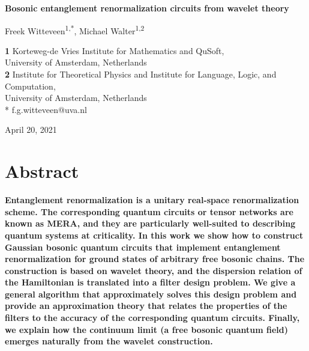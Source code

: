 \documentclass[submission, Phys]{SciPost}
\theoremstyle{definition}
\theoremstyle{remark}
\begin{document}
\begin{center}{\Large \textbf{
Bosonic entanglement renormalization circuits from wavelet theory
}}\end{center}

\begin{center}
Freek Witteveen\textsuperscript{1,*},
Michael Walter\textsuperscript{1,2}
\end{center}


\begin{center}
{\bf 1} Korteweg-de Vries Institute for Mathematics and QuSoft, \\ University of Amsterdam, Netherlands
\\
{\bf 2} Institute for Theoretical Physics and Institute for Language, Logic, and Computation, \\ University of Amsterdam, Netherlands
\\
* f.g.witteveen@uva.nl
\end{center}

\begin{center}
April 20, 2021
\end{center}


\section*{Abstract}
{\bf
Entanglement renormalization is a unitary real-space renormalization scheme.
The corresponding quantum circuits or tensor networks are known as MERA, and they are particularly well-suited to describing quantum systems at criticality.
In this work we show how to construct Gaussian bosonic quantum circuits that implement entanglement renormalization for ground states of arbitrary free bosonic chains.
The construction is based on wavelet theory, and the dispersion relation of the Hamiltonian is translated into a filter design problem.
We give a general algorithm that approximately solves this design problem and provide an approximation theory that relates the properties of the filters to the accuracy of the corresponding quantum circuits. %
Finally, we explain how the continuum limit (a free bosonic quantum field) emerges naturally from the wavelet construction.
}
\end{document}
